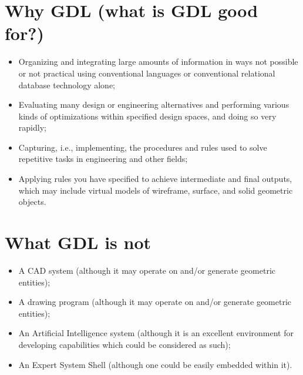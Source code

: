 \documentclass [11pt]{book}
\begin{document}
\section{Why GDL (what is GDL good for?)}

\label{sec:whygdl(whatisgdlgoodfor?)}



\begin{itemize}

\item Organizing and integrating large amounts of information
in ways not possible or not practical using conventional languages or 
conventional relational database technology alone;

\item Evaluating many design or engineering alternatives and 
performing various kinds of optimizations within specified design
spaces, and doing so very rapidly;

\item Capturing, i.e., implementing, the procedures and rules used
to solve repetitive tasks in engineering and other fields;

\item Applying rules you have specified to achieve intermediate
and final outputs, which may include virtual models of wireframe,
surface, and solid geometric objects.

\end{itemize}



\section{What GDL is not}

\label{sec:whatgdlisnot}



\begin{itemize}

\item A CAD system (although it may operate on and/or generate geometric entities);

\item A drawing program (although it may operate on and/or generate geometric entities);

\item An Artificial Intelligence system (although it is an
excellent environment for developing capabilities which could be
considered as such);

\item An Expert System Shell (although one could be easily embedded within it).

\end{itemize}
\end{document}
